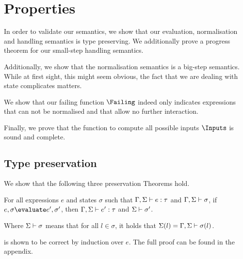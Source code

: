 


\section{Properties}
\label{sec:properties}




In order to validate our semantics, we show that our evaluation, normalisation
and handling semantics is type preserving. We additionally prove a progress
theorem for our small-step handling semantics.

Additionally, we show that the normalisation semantics is a big-step semantics.
While at first sight, this might seem obvious, the fact that we are dealing with
state complicates matters.

We show that our failing function $\Failing$ indeed only indicates expressions
that can not be normalised and that allow no further interaction.

Finally, we prove that the function to compute all possible inputs $\Inputs$ is sound and complete.



\subsection{Type preservation}
\label{sub:preservation}

We show that the following three preservation Theorems hold.

\begin{theorem}
  For all expressions $e$ and states $\sigma$
  such that $\Gamma,\Sigma \vdash e:\tau$ and $\Gamma,\Sigma \vdash \sigma$,
  if $e,\sigma \evaluate e',\sigma'$,
  then $\Gamma,\Sigma \vdash e':\tau$ and $\Sigma \vdash \sigma'$.
  \label{thm:pres-eval}
\end{theorem}

Where $\Sigma \vdash \sigma$ means that for all $l\in \sigma$, it holds that
$\Sigma(l)=\Gamma,\Sigma\vdash \sigma(l)$.

 is shown to be correct by induction over $e$. The full
proof can be found in the appendix.



